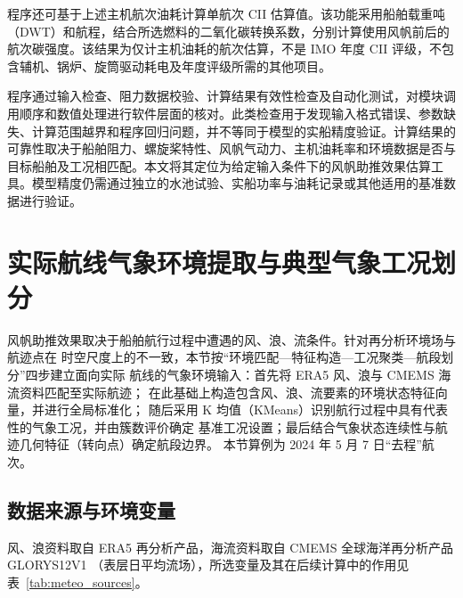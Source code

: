 \documentclass[UTF8,a4paper,twoside,zihao=5,fontset=windows]{ctexart}
\begin{document}
程序还可基于上述主机航次油耗计算单航次 CII 估算值。该功能采用船舶载重吨（DWT）和航程，结合所选燃料的二氧化碳转换系数，分别计算使用风帆前后的航次碳强度。该结果为仅计主机油耗的航次估算，不是 IMO 年度 CII 评级，不包含辅机、锅炉、旋筒驱动耗电及年度评级所需的其他项目。

程序通过输入检查、阻力数据校验、计算结果有效性检查及自动化测试，对模块调用顺序和数值处理进行软件层面的核对。此类检查用于发现输入格式错误、参数缺失、计算范围越界和程序回归问题，并不等同于模型的实船精度验证。计算结果的可靠性取决于船舶阻力、螺旋桨特性、风帆气动力、主机油耗率和环境数据是否与目标船舶及工况相匹配。本文将其定位为给定输入条件下的风帆助推效果估算工具。模型精度仍需通过独立的水池试验、实船功率与油耗记录或其他适用的基准数据进行验证。
\FloatBarrier

\section{实际航线气象环境提取与典型气象工况划分}
\label{sec:meteo}

风帆助推效果取决于船舶航行过程中遭遇的风、浪、流条件。针对再分析环境场与航迹点在
时空尺度上的不一致，本节按“环境匹配—特征构造—工况聚类—航段划分”四步建立面向实际
航线的气象环境输入：首先将 ERA5 风、浪与 CMEMS 海流资料匹配至实际航迹；
在此基础上构造包含风、浪、流要素的环境状态特征向量，并进行全局标准化；
随后采用 K 均值（KMeans）识别航行过程中具有代表性的气象工况，并由簇数评价确定
基准工况设置；最后结合气象状态连续性与航迹几何特征（转向点）确定航段边界。
本节算例为 2024 年 5 月 7 日“去程”航次。

\subsection{数据来源与环境变量}

风、浪资料取自 ERA5 再分析产品，海流资料取自 CMEMS 全球海洋再分析产品 GLORYS12V1
（表层日平均流场），所选变量及其在后续计算中的作用见表~\ref{tab:meteo_sources}。
\end{document}
